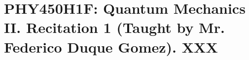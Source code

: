 
%

\chapter{PHY450H1F: Quantum Mechanics II.  Recitation 1 (Taught by Mr. Federico Duque Gomez).  XXX}
\label{chap:qmTwoR1}
{}
\date{Sept XX, 2011}

\beginArtWithToc

\cite{desai2009quantum}

\EndArticle
